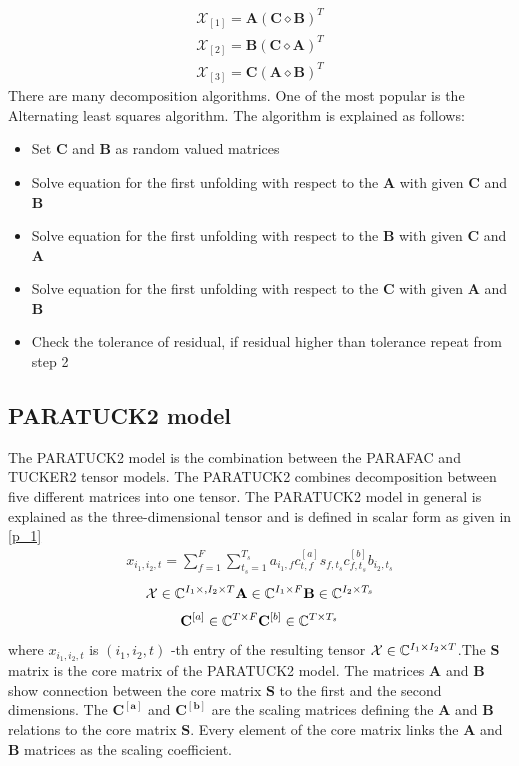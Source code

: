 \begin{align}
\mathcal{X}_{[1]}=\mathbf{A}(\mathbf{C}\diamond \mathbf{B})^T
\label{i_10}
\end{align}
\begin{align}
\mathcal{X}_{[2]}=\mathbf{B}(\mathbf{C}\diamond \mathbf{A})^T
\label{i_11}
\end{align}
\begin{align}
\mathcal{X}_{[3]}=\mathbf{C}(\mathbf{A}\diamond \mathbf{B})^T
\label{i_12}
\end{align}
There are many decomposition algorithms. One of the most popular is the Alternating least squares algorithm. The algorithm is explained as follows:
\begin{itemize}
\item Set $\mathbf{C}$ and $\mathbf{B}$ as random valued matrices
\item Solve equation for the first unfolding with respect to the $\mathbf{A}$ with given $\mathbf{C}$ and $\mathbf{B}$
\item Solve equation for the first unfolding with respect to the $\mathbf{B}$ with given $\mathbf{C}$ and $\mathbf{A}$
\item Solve equation for the first unfolding with respect to the $\mathbf{C}$ with given $\mathbf{A}$ and $\mathbf{B}$
\item Check the tolerance of residual, if residual higher than tolerance repeat from step 2
\end{itemize}
\subsection{PARATUCK2 model}\label{part:PTM}
The PARATUCK2 model is the combination between the PARAFAC \cite{Book12} and TUCKER2 \cite{Book6} tensor models. The PARATUCK2 \cite{Book6} combines decomposition between five different matrices into one tensor. The
PARATUCK2 model in general is explained as the three-dimensional
tensor and is defined in scalar form as given in \eqref{p_1} \cite{Book26}
\begin{align}
x_{i_1,i_2,t}=\sum^{F}_{f=1} \sum^{T_s}_{t_s=1}a_{i_1,f}c^{[a]}_{t,f}s_{f,t_s}c^{[b]}_{f,t_s}b_{i_2,t_s}
\label{p_1}
\end{align}
\begin{align*}
\mathcal{X} \in \mathbb{C}^{I_1 \times, I_2 \times T} \mathbf{A} \in \mathbb{C}^{I_1 \times F} \mathbf{B} \in \mathbb{C}^{I_2 \times T_s}
\end{align*}
\begin{align*}
\mathbf{C}^{[a]} \in \mathbb{C}^{T \times F} \mathbf{C}^{[b]} \in \mathbb{C}^{T \times T_s}
\end{align*}
where $x_{i_1,i_2,t}$ is $(i_1,i_2,t)$ -th entry of the resulting tensor $\mathcal{X} \in \mathbb{C}^{I_1 \times I_2 \times T }$.The $\mathbf{S}$ matrix is the core matrix of the PARATUCK2 model. The matrices $\mathbf{A}$ and $\mathbf{B}$ show connection
between the core matrix $\mathbf{S}$ to the first and the second dimensions. The $\mathbf{C^{[a]}}$ and $\mathbf{C^{[b]}}$ are the scaling matrices defining the $\mathbf{A}$ and $\mathbf{B}$ relations to the core matrix $\mathbf{S}$.  Every element of the core matrix links the $\mathbf{A}$ and $\mathbf{B}$ matrices as the scaling coefficient\cite{Book12}.

